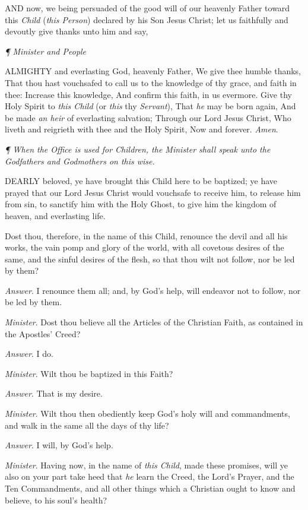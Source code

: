 AND
now, we being persuaded of the good will of our heavenly Father toward
this \emph{Child} (\emph{this Person}) declared by his Son Jesus Christ;
let us faithfully and devoutly give thanks unto him and say,

\emph{¶
Minister and People}

ALMIGHTY
and everlasting God, heavenly Father, We give thee humble thanks, That
thou hast vouchsafed to call us to the knowledge of thy grace, and faith
in thee: Increase this knowledge, And confirm this faith, in us evermore.
Give thy Holy Spirit to \emph{this Child} (or \emph{this} thy \emph{Servant}),
That \emph{he} may be born again, And be made \emph{an heir} of everlasting
salvation; Through our Lord Jesus Christ, Who liveth and reigrieth with
thee and the Holy Spirit, Now and forever. \emph{Amen}.

\emph{¶
When the Office is used for Children, the Minister shall speak unto
the Godfathers and Godmothers on this wise.}

DEARLY
beloved, ye have brought this Child here to be baptized; ye have prayed
that our Lord Jesus Christ would vouchsafe to receive him, to release
him from sin, to sanctify him with the Holy Ghost, to give him the kingdom
of heaven, and everlasting life.

Dost thou, therefore, in the name of this Child, renounce the devil and
all his works, the vain pomp and glory of the world, with all covetous
desires of the same, and the sinful desires of the flesh, so that thou
wilt not follow, nor be led by them?

\emph{Answer}. I renounce them all; and, by God’s help, will endeavor
not to follow, nor be led by them.

\emph{Minister}. Dost thou believe all the Articles of the Christian Faith,
as contained in the Apostles’ Creed?

\emph{Answer}. I do.

\emph{Minister}. Wilt thou be baptized in this Faith?

\emph{Answer}. That is my desire.

\emph{Minister}. Wilt thou then obediently keep God’s
holy will and commandments, and walk in the same all the days of thy life?

\emph{Answer}. I will, by God’s help.

\emph{Minister}. Having now, in the name of \emph{this Child}, made these
promises, will ye also on your part take heed that \emph{he} learn the
Creed, the Lord’s Prayer, and the Ten Commandments, and all other
things which a Christian ought to know and believe, to his soul’s
health?

